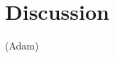 \documentclass{edm_template}
\newcommand{\model}[1]{\hat{y}_C(#1)}
\begin{document}

\section{Discussion}
(Adam)


  
\end{document}
